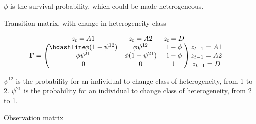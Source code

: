 \documentclass[
  12pt,
]{krantz}
\begin{document}
\(\phi\) is the survival probability, which could be made heterogeneous.

Transition matrix, with change in heterogeneity class

\[\begin{matrix}
& \\
\mathbf{\Gamma} =
  \left ( \vphantom{ \begin{matrix} 12 \\ 12 \\ 12 \end{matrix} } \right .
          \end{matrix}
          \hspace{-1.2em}
          \begin{matrix}
          z_t=A1 & z_t=A2 & z_t=D \\ \hdashline
          \phi (1-\psi^{12}) & \phi \psi^{12} & 1 - \phi\\
          \phi \psi^{21} & \phi (1-\psi^{21}) & 1 - \phi\\
          0 & 0 & 1
          \end{matrix}
          \hspace{-0.2em}
          \begin{matrix}
          & \\
          \left . \vphantom{ \begin{matrix} 12 \\ 12 \\ 12 \end{matrix} } \right )
\begin{matrix}
z_{t-1}=A1 \\ z_{t-1}=A2 \\ z_{t-1}=D
\end{matrix}
\end{matrix}\]

\(\psi^{12}\) is the probability for an individual to change class of heterogeneity, from 1 to 2. \(\psi^{21}\) is the probability for an individual to change class of heterogeneity, from 2 to 1.

Observation matrix
\end{document}
